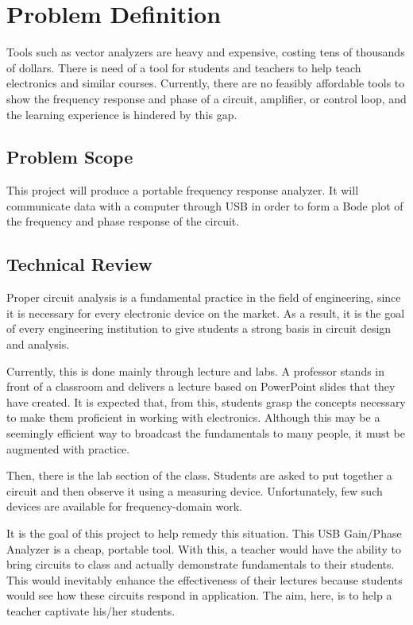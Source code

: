 \chapter{Problem Definition}

Tools such as vector analyzers are heavy and expensive, costing tens of
thousands of dollars.  There is need of a tool for students and teachers to
help teach electronics and similar courses.  Currently, there are no feasibly
affordable tools to show the frequency response and phase of a circuit,
amplifier, or control loop, and the learning experience is hindered by this
gap.

\section{Problem Scope}

This project will produce a portable frequency response analyzer.  It will
communicate data with a computer through USB in order to form a Bode plot of
the frequency and phase response of the circuit.

\section{Technical Review}

Proper circuit analysis is a fundamental practice in the field of engineering,
since it is necessary for every electronic device on the market.  As a result,
it is the goal of every engineering institution to give students a strong basis
in circuit design and analysis.

Currently, this is done mainly through lecture and labs.  A professor stands in
front of a classroom and delivers a lecture based on PowerPoint slides that
they have created.  It is expected that, from this, students grasp the concepts
necessary to make them proficient in working with electronics.  Although this
may be a seemingly efficient way to broadcast the fundamentals to many people,
it must be augmented with practice.

Then, there is the lab section of the class.  Students are asked to put
together a circuit and then observe it using a measuring device. Unfortunately,
few such devices are available for frequency-domain work.

It is the goal of this project to help remedy this situation.  This USB
Gain/Phase Analyzer is a cheap, portable tool.  With this, a teacher would have
the ability to bring circuits to class and actually demonstrate fundamentals to
their students.  This would inevitably enhance the effectiveness of their
lectures because students would see how these circuits respond in application.
The aim, here, is to help a teacher captivate his/her students.

